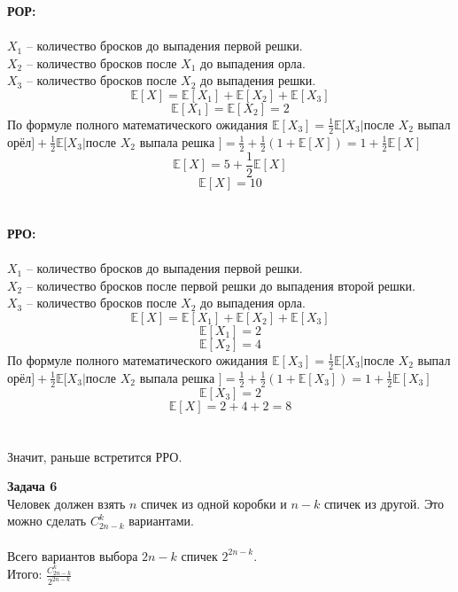 \documentclass[11pt]{article}
\begin{document}
	\textbf{РОР:} \\\\
	$X_1$ -- количество бросков до выпадения первой решки. \\
	$X_2$ -- количество бросков после $X_1$ до выпадения орла. \\
	$X_3$ -- количество бросков после $X_2$ до выпадения решки.
	\[\mathbb{E}[X] = \mathbb{E}[X_1] + \mathbb{E}[X_2] + \mathbb{E}[X_3]\]
	\[\mathbb{E}[X_1] = \mathbb{E}[X_2] = 2\]
	По формуле полного математического ожидания
	$\mathbb{E}[X_3] = \frac{1}{2} \mathbb{E}[X_3|$после $X_2$ выпал орёл$] + \frac{1}{2}\mathbb{E}[X_3|$после $X_2$ выпала решка $] = \frac{1}{2} + \frac{1}{2}(1+\mathbb{E}[X]) = 1 + \frac{1}{2} \mathbb{E}[X]$
	\[\mathbb{E}[X] = 5 + \frac{1}{2} \mathbb{E}[X]\]
	\[\mathbb{E}[X] = 10\]
	\\
	\\
	
	\textbf{РРО:} \\\\
	$X_1$ -- количество бросков до выпадения первой решки. \\
	$X_2$ -- количество бросков после первой решки до выпадения второй решки. \\
	$X_3$ -- количество бросков после $X_2$ до выпадения орла.
	\[\mathbb{E}[X] = \mathbb{E}[X_1] + \mathbb{E}[X_2] + \mathbb{E}[X_3]\]
	\[\mathbb{E}[X_1] = 2\]
	\[\mathbb{E}[X_2] = 4\]
 	По формуле полного математического ожидания
 	$\mathbb{E}[X_3] = \frac{1}{2} \mathbb{E}[X_3|$после $X_2$ выпал орёл$] + \frac{1}{2}\mathbb{E}[X_3|$после $X_2$ выпала решка $] = \frac{1}{2} + \frac{1}{2}(1+\mathbb{E}[X_3]) = 1 + \frac{1}{2} \mathbb{E}[X_3]$
 	\[\mathbb{E}[X_3] = 2\]
 	\[\mathbb{E}[X] = 2+4+2 = 8\]
 	\\\\
 	Значит, раньше встретится РРО.
 	\newpage
 	
 	\textbf{Задача 6}
   	\\
   	Человек должен взять $n$ спичек из одной коробки и $n-k$ спичек из другой. Это можно сделать $C_{2n-k}^{k}$ вариантами. \\\\
   	Всего вариантов выбора $2n-k$ спичек $2^{2n-k}$.
   	\\
  	Итого: $\frac{C_{2n-k}^{k}}{2^{2n-k}}$
\end{document}
